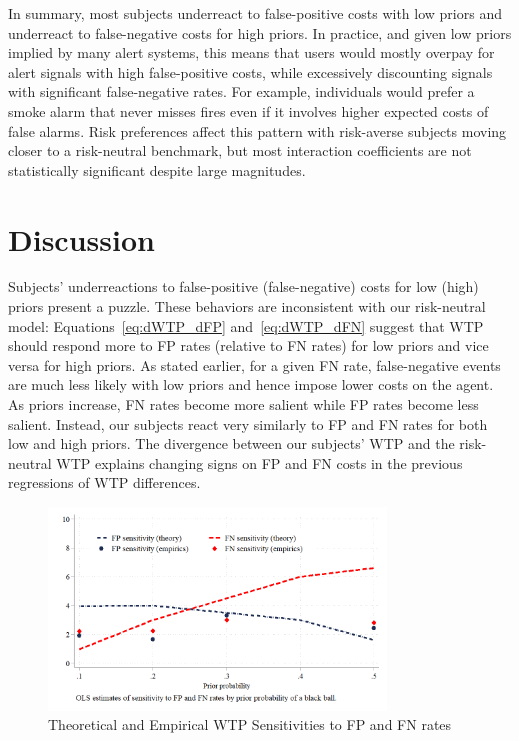 \documentclass[12pt,a4paper]{article}
\begin{document}
In summary, most subjects underreact to false-positive costs with low priors and underreact to false-negative costs for high priors. In practice, and given low priors implied by many alert systems, this means that users would mostly overpay for alert signals with high false-positive costs, while excessively discounting signals with significant false-negative rates. For example, individuals would prefer a smoke alarm that never misses fires even if it involves higher expected costs of false alarms. Risk preferences affect this pattern with risk-averse subjects moving closer to a risk-neutral benchmark, but most interaction coefficients are not statistically significant despite large magnitudes.






\section{Discussion}

Subjects' underreactions to false-positive (false-negative) costs for low (high) priors present a puzzle. These behaviors are inconsistent with our risk-neutral model: Equations~\ref{eq:dWTP_dFP} and~\ref{eq:dWTP_dFN} suggest that WTP should respond more to FP rates (relative to FN rates) for low priors and vice versa for high priors. As stated earlier, for a given FN rate, false-negative events are much less likely with low priors and hence impose lower costs on the agent. As priors increase, FN rates become more salient while FP rates become less salient. Instead, our subjects react very similarly to FP and FN rates for both low and high priors. The divergence between our subjects' WTP and the risk-neutral WTP explains changing signs on FP and FN costs in the previous regressions of WTP differences.



\begin{figure}[H]
\centering
\caption{Theoretical and Empirical WTP Sensitivities to FP and FN rates} \label{fig:Comparison}
\includegraphics[width=0.8\textwidth]{Graphs/sensit_comparison.png}
\end{figure}
\end{document}
